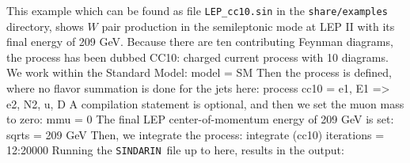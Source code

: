 \documentclass[12pt]{book}
\newenvironment{code}%
  {\begingroup\footnotesize
   \quote
   \Verbatim}%
  {\endVerbatim
   \endquote
   \endgroup\noindent}
\newcommand{\ttt}[1]{\texttt{#1}}
\newcommand{\sindarin}{\ttt{SINDARIN}}
\begin{document}
This example which can be found as file \ttt{LEP\_cc10.sin} in the
\ttt{share/examples} directory, shows $W$ pair production in the
semileptonic mode at LEP II with its final energy of 209 GeV. Because
there are ten contributing Feynman diagrams, the process has been
dubbed CC10: charged current process with 10 diagrams. We work within
the Standard Model:
\begin{code}
  model = SM
\end{code}
Then the process is defined, where no flavor summation is done for the
jets here:
\begin{code}
  process cc10 = e1, E1 => e2, N2, u, D
\end{code}
A compilation statement is optional, and then we set the muon mass to
zero:
\begin{code}
  mmu = 0
\end{code}
The final LEP center-of-momentum energy of 209 GeV is set:
\begin{code}
  sqrts = 209 GeV
\end{code}
Then, we integrate the process:
\begin{code}
  integrate (cc10) { iterations = 12:20000 }
\end{code}
Running the \sindarin\ file up to here, results in the output:
\end{document}
